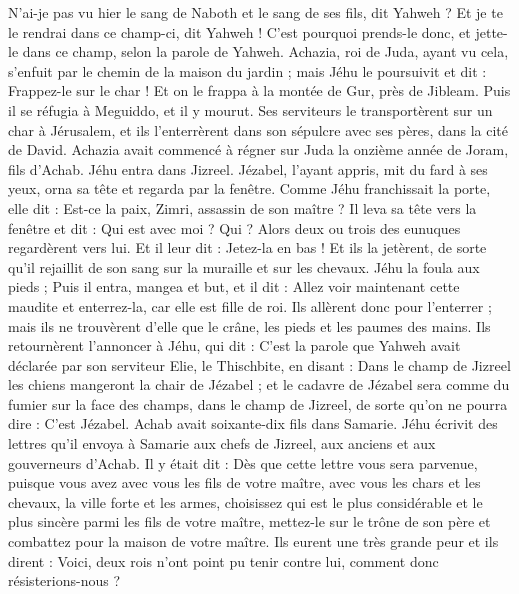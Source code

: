 \begin{multicols}{2}
 N’ai-je pas vu hier le sang de Naboth et le sang de ses fils, dit Yahweh ? Et je te le rendrai dans ce champ-ci, dit Yahweh ! C'est pourquoi prends-le donc, et jette-le dans ce champ, selon la parole de Yahweh.
Achazia, roi de Juda, ayant vu cela, s'enfuit par le chemin de la maison du jardin ; mais Jéhu le poursuivit et dit : Frappez-le sur le char ! Et on le frappa à la montée de Gur, près de Jibleam. Puis il se réfugia à Meguiddo, et il y mourut.
Ses serviteurs le transportèrent sur un char à Jérusalem, et ils l'enterrèrent dans son sépulcre avec ses pères, dans la cité de David.
Achazia avait commencé à régner sur Juda la onzième année de Joram, fils d'Achab.
Jéhu entra dans Jizreel. Jézabel, l'ayant appris, mit du fard à ses yeux, orna sa tête et regarda par la fenêtre.
Comme Jéhu franchissait la porte, elle dit : Est-ce la paix, Zimri, assassin de son maître ?
Il leva sa tête vers la fenêtre et dit : Qui est avec moi ? Qui ? Alors deux ou trois des eunuques regardèrent vers lui.
Et il leur dit : Jetez-la en bas ! Et ils la jetèrent, de sorte qu'il rejaillit de son sang sur la muraille et sur les chevaux. Jéhu la foula aux pieds ;
Puis il entra, mangea et but, et il dit : Allez voir maintenant cette maudite et enterrez-la, car elle est fille de roi.
Ils allèrent donc pour l'enterrer ; mais ils ne trouvèrent d'elle que le crâne, les pieds et les paumes des mains.
Ils retournèrent l'annoncer à Jéhu, qui dit : C'est la parole que Yahweh avait déclarée par son serviteur Elie, le Thischbite, en disant : Dans le champ de Jizreel les chiens mangeront la chair de Jézabel ;
et le cadavre de Jézabel sera comme du fumier sur la face des champs, dans le champ de Jizreel, de sorte qu'on ne pourra dire : C'est Jézabel.
\VerseOne{}Achab avait soixante-dix fils dans Samarie. Jéhu écrivit des lettres qu'il envoya à Samarie aux chefs de Jizreel, aux anciens et aux gouverneurs d'Achab. Il y était dit :
Dès que cette lettre vous sera parvenue, puisque vous avez avec vous les fils de votre maître, avec vous les chars et les chevaux, la ville forte et les armes,
choisissez qui est le plus considérable et le plus sincère parmi les fils de votre maître, mettez-le sur le trône de son père et combattez pour la maison de votre maître.
Ils eurent une très grande peur et ils dirent : Voici, deux rois n'ont point pu tenir contre lui, comment donc résisterions-nous ?

\end{multicols}
